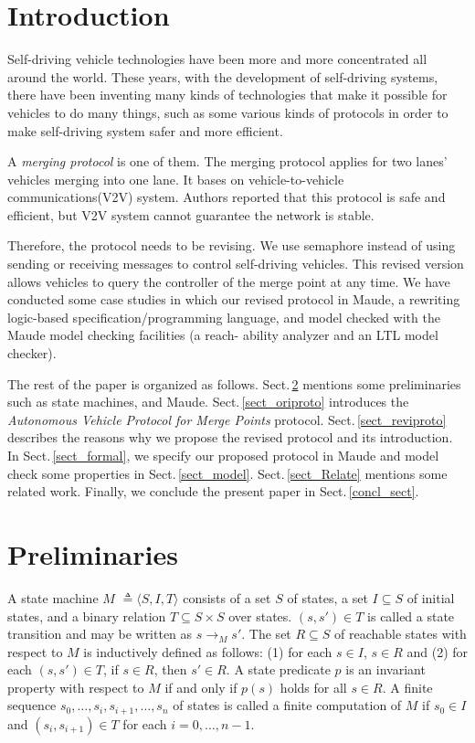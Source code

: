 \documentclass[10pt, conference, compsocconf]{IEEEtran}
\begin{document}
\setlength{\parindent}{1em}
\section{Introduction}
 \label{sect_intro}
Self-driving vehicle technologies have been more and more concentrated all around the world.
These years, with the development of self-driving systems, there have been inventing many kinds of technologies that make it possible for vehicles to do many things, such as some various kinds of protocols in order to make self-driving system safer and more efficient. 

A \textit{merging protocol} \cite{10.1145/3055004.3055028} is one of them. The merging protocol applies for two lanes' vehicles merging into one lane. It bases on vehicle-to-vehicle communications(V2V) system. Authors reported that this protocol is safe and efficient, but V2V system cannot guarantee the network is stable.

Therefore, the protocol needs to be revising.
We use semaphore instead of using sending or receiving messages to control self-driving vehicles. 
This revised version allows vehicles to query the controller of the merge point at any time.
We have conducted some case studies in which our revised protocol in Maude, a rewriting logic-based specification/programming language, and model checked with the Maude model checking facilities (a reach- ability analyzer and an LTL model checker).

The rest of the paper is organized as  follows. Sect.\,\ref{sect_Prel}
mentions some preliminaries such as state machines, and Maude.
Sect.\,\ref{sect_oriproto} introduces the \textit{Autonomous Vehicle Protocol for Merge Points} protocol.
Sect.\,\ref{sect_reviproto} describes the reasons why we propose the revised protocol and its introduction.
In Sect.\,\ref{sect_formal}, we specify our proposed protocol in Maude and model check some properties in Sect.\,\ref{sect_model}.
Sect.\,\ref{sect_Relate} mentions some related work.
Finally, we conclude the present paper in Sect.\,\ref{concl_sect}.




\section{Preliminaries}
 \label{sect_Prel}
 
 
A state machine $M$ $\triangleq \langle S, I, T \rangle$ consists of a
set $S$ of states, a set $I \subseteq S$ of initial states, and a
binary relation $T \subseteq S \times S$ over states.  $(s, s') \in T$
is called a state transition and may be written as $s \rightarrow_M
s'$.  The set $R \subseteq S$ of reachable states with respect to $M$
is inductively defined as follows: (1) for each $s \in I$, $s \in R$
and (2) for each $(s,s') \in T$, if $s \in R$, then $s' \in R$. A
state predicate $p$ is an invariant property with respect to ${M}$ if
and only if $p(s)$ holds for all $s \in R$.  A finite sequence $s_0,
\ldots , s_i, s_{i+1},\ldots , s_n$ of states is called a finite
computation of $M$ if $s_0 \in I$ and $(s_i, s_{i+1}) \in T$ for each
$i = 0, \ldots , n - 1$.
\end{document}
